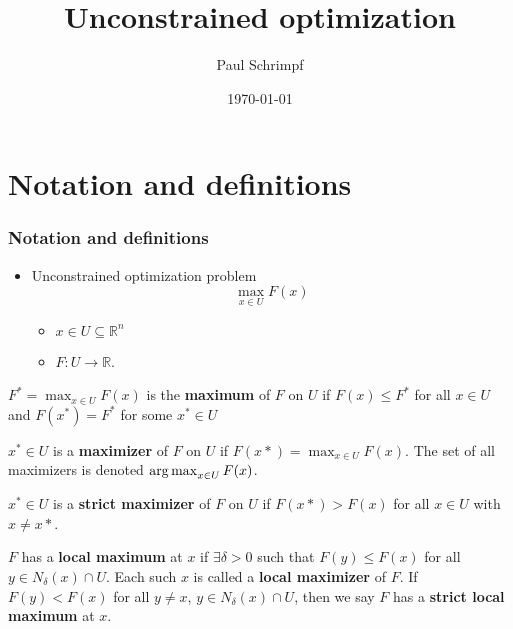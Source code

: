 \documentclass[compress]{beamer}
\title{Unconstrained optimization}
\author{Paul Schrimpf}
\institute{UBC \\ Economics 526}
\date{\today}
\newcommand{\argmax}{\operatornamewithlimits{arg\,max}}
\def\R{\mathbb{R}}
\renewcommand{\to}{{\rightarrow}}
\begin{document}
\frame{\titlepage}

\begin{frame}
  \tableofcontents  
\end{frame}

\section{Notation and definitions}

\begin{frame}
  \frametitle{Notation and definitions}
  \begin{itemize} 
  \item Unconstrained optimization problem
    \[ \max_{x\in U} F(x) \]
    \begin{itemize}
    \item $x \in U \subseteq \R^n$ 
    \item $F: U \to \R$.
    \end{itemize}
  \end{itemize}
  \begin{definition}\label{d:max}
    $F^* = \max_{x \in U} F(x)$ is the \textbf{maximum} of $F$ on $U$ if
    $F(x) \leq F^*$ for all $x \in U$ and $F(x^*) = F^*$ for some $x^*
    \in U$
  \end{definition}
  \begin{definition} \label{d:maxer}
    $x^* \in U$ is a \textbf{maximizer} of $F$ on $U$ if $F(x*)
    = \max_{x \in U} 
    F(x)$. The set of all maximizers is denoted $\argmax_{x \in U}
    F(x)$.
  \end{definition}
\end{frame}

\begin{frame}
  \begin{definition}\label{d:smaxer}
    $x^* \in U$ is a \textbf{strict maximizer} of $F$ on $U$ if $F(x*) > F(x)
    $ for all $x \in U$ with $x \neq x*$. 
  \end{definition}
  \begin{definition}\label{d:lmax}
    $F$ has a \textbf{local maximum} at $x$ if $\exists \delta > 0$ such
    that $F(y) \leq F(x)$ for all $y \in  N_\delta(x) \cap U$. Each such
    $x$ is called a \textbf{local maximizer} of $F$. If $F(y) < F(x)$
    for all $y \neq x$, $y \in N_\delta(x) \cap U$, then we say $F$ has
    a \textbf{strict local maximum} at $x$.
  \end{definition}
\end{frame}
\end{document}
